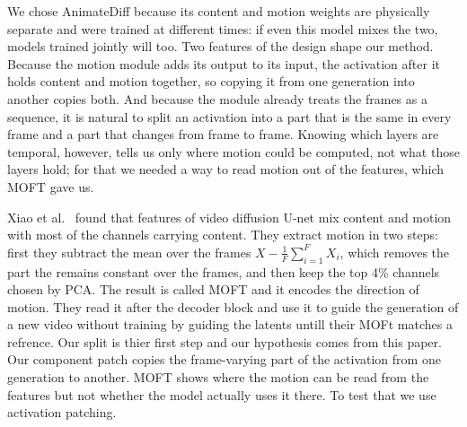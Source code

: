 \documentclass[twoside,english]{article}
\begin{document}
We chose AnimateDiff because its content and motion weights are physically separate and were trained
at different times: if even this model mixes the two, models trained jointly will too. Two features of
the design shape our method. Because the motion module adds its output to its input, the activation
after it holds content and motion together, so copying it from one generation into another copies
both. And because the module already treats the frames as a sequence, it is natural to split an
activation into a part that is the same in every frame and a part that changes from frame to frame.
Knowing which layers are temporal, however, tells us only where motion could be computed, not what
those layers hold; for that we needed a way to read motion out of the features, which MOFT gave us. 

Xiao et al.\ \citep{xiao2024moft} found that features of video diffusion U-net mix content and motion
with most of the channels carrying content. They extract motion in two steps: first they subtract the mean over the frames
$X - \frac{1}{F}\sum_{i=1}^{F} X_i$, which removes the part the remains constant over the frames,
and then keep the top 4\% channels chosen by PCA. The result is called MOFT and it encodes the 
direction of motion. They read it after the decoder block and use it to guide the generation 
of a new video without training by guiding the latents untill their MOFt matches a refrence. 
Our split is thier first step and our hypothesis comes from this paper. 
Our component patch copies the frame-varying part of the activation from one generation to another.
MOFT shows where the motion can be read from the features but not whether the model actually uses it there. 
To test that we use activation patching. 
\end{document}
